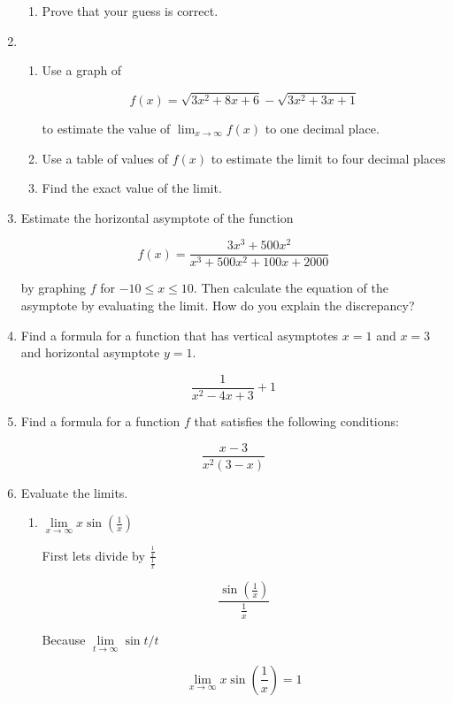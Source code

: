 \documentclass{article}
\begin{document}
\begin{enumerate}
\begin{enumerate}
			\item Prove that your guess is correct.
		\end{enumerate}

		\item
		\begin{enumerate}
			\item Use a graph of
			
			$$f(x) = \sqrt{3x^2 + 8x + 6} - \sqrt{3x^2 + 3x + 1}$$

			to estimate the value of $\lim _{x \to \infty} f(x)$ to one
			decimal place.

			\item Use a table of values of $f(x)$ to estimate the limit to
				four decimal places

			\item Find the exact value of the limit.
		\end{enumerate}

		\item Estimate the horizontal asymptote of the function

		$$f(x) = \frac{3x^3 + 500x^2}{x^3 + 500x^2 + 100x + 2000}$$

		by graphing $f$ for $-10 \leq x \leq 10$. Then calculate the
		equation of the asymptote by evaluating the limit. How do you
		explain the discrepancy?

		\item Find a formula for a function that has vertical asymptotes
		$x = 1$ and $x = 3$ and horizontal asymptote $y = 1$.

		$$\frac{1}{x^2 - 4x + 3} + 1$$

		\item Find a formula for a function $f$ that satisfies the following
			conditions:

			$$\frac{x-3}{x^2(3-x)}$$

		\item Evaluate the limits.

		\begin{enumerate}
			\item $\lim \limits _{x \to \infty} x \sin (\frac{1}{x})$

			First lets divide by $\frac{ \frac{1}{x} }{ \frac{1}{x} }$

			$$\frac{\sin (\frac{1}{x})}{\frac{1}{x}}$$

			Because $\lim \limits _{t \to \infty} \sin{t}/t$

			$$\lim \limits _{x \to \infty} x \sin(\frac{1}{x}) = 1$$


\end{enumerate}
\end{enumerate}
\end{document}
